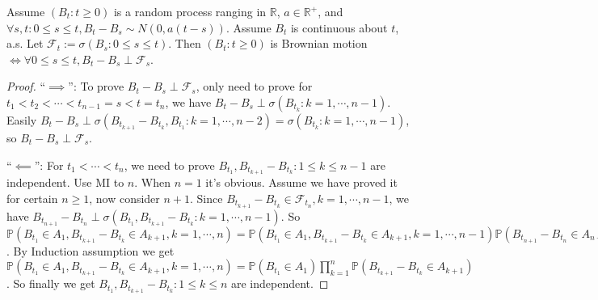 \documentclass{ctexart}
\newif\ifpreface
\begin{document}
\large
\iffalse
  \setlength{\baselineskip}{1.2em}
  \ifpreface
    
  \else
    \maketitle
  \fi
\fi
{}
\begin{lemma}\label{lem:1}
  Assume \((B_t:t \geq 0)\) is a random process ranging in \(\mathbb{R}\), \(a \in \mathbb{R}^+\), and \(\forall s,t:0 \leq s \leq t,B_t-B_s \sim N(0,a(t-s))\).
  Assume \(B_t\) is continuous about \(t\), a.s.
  Let \(\mathcal{F}_t:=\sigma(B_s:0 \leq s \leq t)\).
  Then \((B_t:t \geq 0)\) is Brownian motion \(\iff \forall 0 \leq s \leq t,B_t - B_s \perp \mathcal{F}_s\).
\end{lemma}
\begin{proof}
  ``\(\implies\)'': To prove \(B_t-B_s \perp \mathcal{F}_s\), only need to prove for \(t_1 < t_2 < \cdots <t_{n-1}=s<t=t_n\), we have
  \(B_t-B_s \perp \sigma(B_{t_k}:k=1,\cdots,n-1)\).
  Easily \(B_t-B_s \perp \sigma(B_{t_{k+1}}-B_{t_k},B_{t_1}:k=1,\cdots,n-2)=\sigma(B_{t_k}:k=1,\cdots,n-1)\), so \(B_t-B_s \perp \mathcal{F}_s\).

  ``\(\impliedby\)'': For \(t_1 < \cdots < t_n\), we need to prove \(B_{t_1},B_{t_{k+1}}-B_{t_k}:1 \leq k \leq n-1\) are independent.
  Use MI to \(n\). When \(n=1\) it's obvious.
  Assume we have proved it for certain \(n \geq 1\), now consider \(n+1\).
  Since \(B_{t_{k+1}}-B_{t_k} \in \mathcal{F}_{t_n},k=1,\cdots,n-1\), we have \(B_{t_{n+1}}-B_{t_n} \perp \sigma(B_{t_1},B_{t_{k+1}}-B_{t_k}:k=1,\cdots,n-1)\).
  So \(\mathbb{P}(B_{t_1} \in A_1,B_{t_{k+1}}-B_{t_k} \in A_{k+1},k=1,\cdots,n)=\mathbb{P}(B_{t_1} \in A_1,B_{t_{k+1}}-B_{t_k} \in A_{k+1},k=1,\cdots,n-1)\mathbb{P}(B_{t_{n+1}}-B_{t_n} \in A_{n+1})\).
  By Induction assumption we get \(\mathbb{P}(B_{t_1} \in A_1,B_{t_{k+1}}-B_{t_k} \in A_{k+1},k=1,\cdots,n)=\mathbb{P}(B_{t_1}\in A_1) \prod_{k=1}^{n}\mathbb{P}(B_{t_{k+1}}-B_{t_k} \in A_{k+1})\).
  So finally we get \(B_{t_1},B_{t_{k+1}}-B_{t_k}:1 \leq k \leq n\) are independent.
\end{proof}
\end{document}
